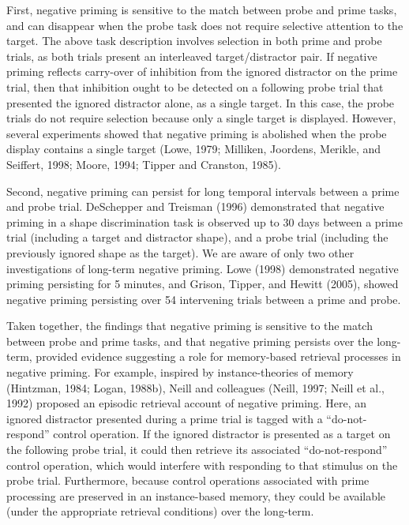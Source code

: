\documentclass[]{DissertateCUNY}
\begin{document}
First, negative priming is sensitive to the match between probe and
prime tasks, and can disappear when the probe task does not require
selective attention to the target. The above task description involves
selection in both prime and probe trials, as both trials present an
interleaved target/distractor pair. If negative priming reflects
carry-over of inhibition from the ignored distractor on the prime trial,
then that inhibition ought to be detected on a following probe trial
that presented the ignored distractor alone, as a single target. In this
case, the probe trials do not require selection because only a single
target is displayed. However, several experiments showed that negative
priming is abolished when the probe display contains a single target
(Lowe, 1979; Milliken, Joordens, Merikle, and Seiffert, 1998; Moore,
1994; Tipper and Cranston, 1985).

Second, negative priming can persist for long temporal intervals between
a prime and probe trial. DeSchepper and Treisman (1996) demonstrated
that negative priming in a shape discrimination task is observed up to
30 days between a prime trial (including a target and distractor shape),
and a probe trial (including the previously ignored shape as the
target). We are aware of only two other investigations of long-term
negative priming. Lowe (1998) demonstrated negative priming persisting
for 5 minutes, and Grison, Tipper, and Hewitt (2005), showed negative
priming persisting over 54 intervening trials between a prime and probe.

Taken together, the findings that negative priming is sensitive to the
match between probe and prime tasks, and that negative priming persists
over the long-term, provided evidence suggesting a role for memory-based
retrieval processes in negative priming. For example, inspired by
instance-theories of memory (Hintzman, 1984; Logan, 1988b), Neill and
colleagues (Neill, 1997; Neill et al., 1992) proposed an episodic
retrieval account of negative priming. Here, an ignored distractor
presented during a prime trial is tagged with a ``do-not-respond''
control operation. If the ignored distractor is presented as a target on
the following probe trial, it could then retrieve its associated
``do-not-respond'' control operation, which would interfere with
responding to that stimulus on the probe trial. Furthermore, because
control operations associated with prime processing are preserved in an
instance-based memory, they could be available (under the appropriate
retrieval conditions) over the long-term.
\end{document}
